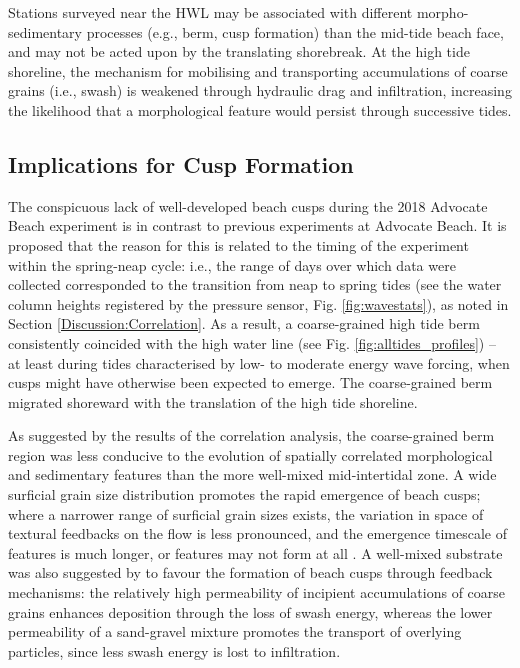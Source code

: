 \documentclass[preprint,12pt,authoryear]{elsarticle}
\begin{document}
Stations surveyed near the HWL may be associated with different morpho-sedimentary processes (e.g., berm, cusp formation) than the mid-tide beach face, and may not be acted upon by the translating shorebreak. At the high tide shoreline, the mechanism for mobilising and transporting accumulations of coarse grains (i.e., swash) is weakened through hydraulic drag and infiltration, increasing the likelihood that a morphological feature would persist through successive tides.


\subsection{Implications for Cusp Formation}\label{Discussion:Cusps}

The conspicuous lack of well-developed beach cusps during the 2018 Advocate Beach experiment is in contrast to previous experiments at Advocate Beach. It is proposed that the reason for this is related to the timing of the experiment within the spring-neap cycle: i.e., the range of days over which data were collected corresponded to the transition from neap to spring tides (see the water column heights registered by the pressure sensor, Fig. \ref{fig:wavestats}), as noted in Section \ref{Discussion:Correlation}. As a result, a coarse-grained high tide berm consistently coincided with the high water line (see Fig. \ref{fig:alltides_profiles}) -- at least during tides characterised by low- to moderate energy wave forcing, when cusps might have otherwise been expected to emerge. The coarse-grained berm migrated shoreward with the translation of the high tide shoreline.

As suggested by the results of the correlation analysis, the coarse-grained berm region was less conducive to the evolution of spatially correlated morphological and sedimentary features than the more well-mixed mid-intertidal zone. A wide surficial grain size distribution promotes the rapid emergence of beach cusps; where a narrower range of surficial grain sizes exists, the variation in space of textural feedbacks on the flow is less pronounced, and the emergence timescale of features is much longer, or features may not form at all \citep[e.g.,][]{Guest_Hay2019}. A well-mixed substrate was also suggested by \citet{LonguetHiggins_Parkin1962} to favour the formation of beach cusps through feedback mechanisms: the relatively high permeability of incipient accumulations of coarse grains enhances deposition through the loss of swash energy, whereas the lower permeability of a sand-gravel mixture promotes the transport of overlying particles, since less swash energy is lost to infiltration. 
\end{document}
